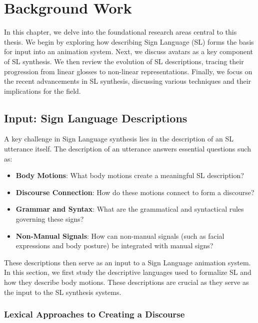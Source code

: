\documentclass[../../main.tex]{subfiles}
\begin{document}
\chapter{Background Work}
\label{ch:background_work}

In this chapter, we delve into the foundational research areas central to this thesis. We begin by exploring how describing Sign Language (SL) forms the basis for input into an animation system. Next, we discuss avatars as a key component of SL synthesis. We then review the evolution of SL descriptions, tracing their progression from linear glosses to non-linear representations. Finally, we focus on the recent advancements in SL synthesis, discussing various techniques and their implications for the field.

\section{Input: Sign Language Descriptions}
\label{sec:sign_language_descriptions}

A key challenge in Sign Language synthesis lies in the description of an SL utterance itself. The description of an utterance answers essential questions such as:

\begin{itemize}
  \item \textbf{Body Motions}: What body motions create a meaningful SL description?
  \item \textbf{Discourse Connection}: How do these motions connect to form a discourse?
  \item \textbf{Grammar and Syntax}: What are the grammatical and syntactical rules governing these signs?
  \item \textbf{Non-Manual Signals}: How can non-manual signals (such as facial expressions and body posture) be integrated with manual signs?
\end{itemize}

These descriptions then serve as an input to a Sign Language animation system. In this section, we first study the descriptive languages used to formalize SL and how they describe body motions. These descriptions are crucial as they serve as the input to the SL synthesis systems.

\subsection{Lexical Approaches to Creating a Discourse}
\label{subsec:lexical_approaches}
\end{document}
